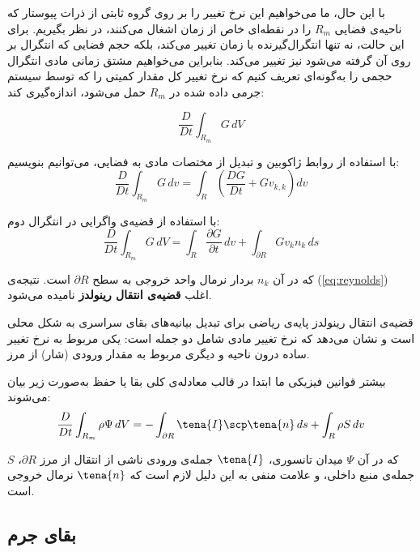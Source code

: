 با این حال، ما می‌خواهیم این نرخ تغییر را بر روی گروه ثابتی از ذرات پیوستار که ناحیه‌ی فضایی $R_m$ را در نقطه‌ای خاص از زمان اشغال می‌کنند، در نظر بگیریم. برای این حالت، نه تنها انتگرال‌گیرنده با زمان تغییر می‌کند، بلکه حجم فضایی که انتگرال بر روی آن گرفته می‌شود نیز تغییر می‌کند. بنابراین می‌خواهیم مشتق زمانی مادی انتگرال حجمی را به‌گونه‌ای تعریف کنیم که نرخ تغییر کل مقدار کمیتی را که توسط سیستم جرمی داده شده در $R_m$ حمل می‌شود، اندازه‌گیری کند:

\begin{equation}
	\frac{D}{Dt} \int_{R_m} G \, dV
\end{equation}

با استفاده از روابط ژاکوبین و تبدیل از مختصات مادی به فضایی، می‌توانیم بنویسیم:
\begin{equation}
	\frac{D}{Dt} \int_{R_m} G \, dv = \int_R \left( \frac{DG}{Dt} + G v_{k,k} \right) dv
\end{equation}

با استفاده از قضیه‌ی واگرایی در انتگرال دوم:
\begin{equation}
	\frac{D}{Dt} \int_{R_m} G \, dV = \int_R \frac{\partial G}{\partial t} \, dv + \int_{\partial R} G v_k n_k \, ds
\end{equation}

که در آن $n_k$ بردار نرمال واحد خروجی به سطح $\partial R$ است. نتیجه‌ی (\ref{eq:reynolds}) اغلب \textbf{قضیه‌ی انتقال رینولدز} نامیده می‌شود.

\begin{keypoint}
	قضیه‌ی انتقال رینولدز پایه‌ی ریاضی برای تبدیل بیانیه‌های بقای سراسری به شکل محلی است و نشان می‌دهد که نرخ تغییر مادی شامل دو جمله است: یکی مربوط به نرخ تغییر ساده درون ناحیه و دیگری مربوط به مقدار ورودی (شار) از مرز.
\end{keypoint}

بیشتر قوانین فیزیکی ما ابتدا در قالب معادله‌ی کلی بقا یا حفظ به‌صورت زیر بیان می‌شوند:
\begin{equation}
	\frac{D}{Dt} \int_{R_m} \rho \Psi \, dV = -\int_{\partial R} \tena{I} \scp \tena{n} \, ds + \int_R \rho S \, dv
\end{equation}

که در آن $\Psi$ میدان تانسوری، $\tena{I}$ جمله‌ی ورودی ناشی از انتقال از مرز $\partial R$، $S$ جمله‌ی منبع داخلی، و علامت منفی به این دلیل لازم است که $\tena{n}$ نرمال خروجی است.

\subsection{بقای جرم}

